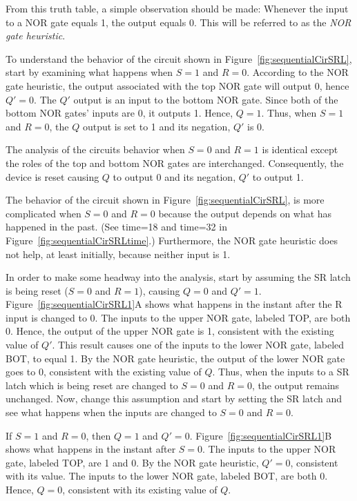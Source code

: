 From this truth table, a simple observation should be made:
Whenever the input to a NOR gate equals 1, the output equals 0.
This will be referred to as the \textit{ NOR gate heuristic}.

To understand the behavior of the circuit shown in
Figure~\ref{fig:sequentialCirSRL}, start by examining what happens when
$S=1$ and $R=0$.  According to the NOR gate heuristic, the output
associated with the top NOR gate will output 0, hence $Q'=0$.
The $Q'$ output is an input to the bottom NOR gate.  Since both
of the bottom NOR gates' inputs are 0, it outputs 1.  Hence,
$Q=1$.  Thus, when $S=1$ and $R=0$, the $Q$ output is set to 1 and
its negation, $Q'$ is 0.

The analysis of the circuits behavior when $S=0$ and $R=1$ is
identical except the roles of the top and bottom NOR gates
are interchanged.  Consequently, the device is reset causing
$Q$ to output 0 and its negation, $Q'$ to output 1.

The behavior of the circuit shown in Figure~\ref{fig:sequentialCirSRL},
is more complicated when $S=0$ and $R=0$ because the output
depends on what has happened in the past. (See time=18 and time=32
in Figure~\ref{fig:sequentialCirSRLtime}.)  Furthermore, the NOR gate
heuristic does not help, at least initially, because neither
input is 1.

In order to make some headway into the analysis, start
by assuming the SR latch is being reset ($S=0$ and $R=1$),
causing $Q=0$ and $Q'=1$.  Figure~\ref{fig:sequentialCirSRL1}A shows what
happens in the instant after the R input is changed to 0.
The inputs to the upper NOR gate, labeled TOP, are both 0.
Hence, the output of the upper NOR gate is 1, consistent with
the existing value of $Q'$.  This result causes one of the inputs to
the lower NOR gate, labeled BOT, to equal 1.  By the NOR
gate heuristic, the output of the lower NOR gate goes to 0,
consistent with the existing value of $Q$.  Thus, when the
inputs to a SR latch which is being reset are changed to
$S=0$ and $R=0$, the output remains unchanged.  Now, change this
assumption and start by setting the SR latch and see what happens
when the inputs are changed to $S=0$ and $R=0$.

If $S=1$ and $R=0$, then $Q=1$ and $Q'=0$.  Figure~\ref{fig:sequentialCirSRL1}B
shows what happens in the instant after $S=0$.  The inputs to
the upper NOR gate, labeled TOP, are 1 and 0.  By the NOR
gate heuristic, $Q'=0$, consistent with its value.  The
inputs to the lower NOR gate, labeled BOT, are both 0. Hence,
$Q=0$, consistent with its existing value of $Q$.

